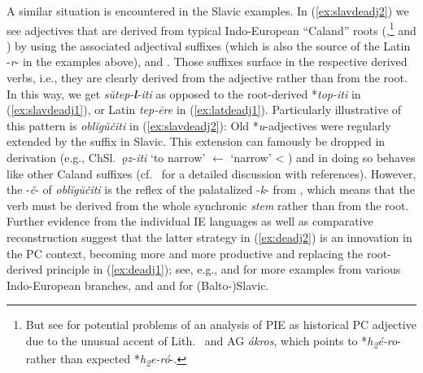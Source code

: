 \documentclass[output=paper,colorlinks,citecolor=brown]{langscibook}
\begin{document}
A similar situation is encountered in the Slavic examples. In (\ref{ex:slavdeadj2}) we see adjectives that are derived from typical Indo-European ``Caland'' roots  (,\footnote{But see \citet[10]{Nussbaum2021} for potential problems of an analysis of PIE  as historical PC adjective due to the unusual accent of Lith.\  and AG \textit{ákros}, which points to *\textit{h\textsubscript{2}é\kinvbreve -ro}- rather than expected *\textit{h\textsubscript{2}e\kinvbreve -ró}-.}  and ) by using the associated adjectival suffixes  (which is also the source of the Latin -\textit{r}- in the examples above),  and . Those suffixes surface in the respective derived verbs, i.e., they are clearly derived from the adjective rather than from the root. In this way, we get \textit{sŭtep-\textbf{l}-iti} as opposed to the root-derived  *\textit{top-iti}  in (\ref{ex:slavdeadj1}), or Latin \textit{tep-ēre}  in (\ref{ex:latdeadj1}). Particularly illustrative of this pattern is \textit{oblĭgŭčiti}  in (\ref{ex:slavdeadj2}): Old *\textit{u}-adjectives  were regularly extended by the suffix  in Slavic. This extension can famously be dropped in derivation (e.g., ChSl.\ \textit{ǫz-iti}  `to narrow' $\leftarrow$  `narrow' < ) and in doing so behaves like other Caland suffixes  (cf.\ \citealt[§4.2]{Majer2017} for a detailed discussion with references). However, the -\textit{č}- of \textit{oblĭgŭčiti} is the reflex of the palatalized -\textit{k}- from , which means that the verb must be derived from the whole synchronic \textit{stem} rather than from the root. Further evidence from the individual IE languages as well as comparative reconstruction suggest that the latter strategy in (\ref{ex:deadj2}) is an innovation in the PC context, becoming more and more productive and replacing the root-derived principle in (\ref{ex:deadj1}); see, e.g., \citet{Watkins1971} and \citet{Nussbaum1976} for more examples from various Indo-European branches, and \citet{Majer2017} and \citet{Reiter2023} for (Balto-)Slavic.
\end{document}
